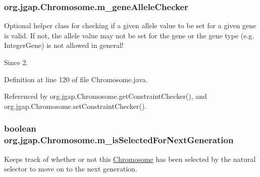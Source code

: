 \hypertarget{classorg_1_1jgap_1_1_chromosome_af890b1160c9b97defdf107e6a4e53329}{
\subsubsection[{m\-\_\-gene\-Allele\-Checker}]{ org.\-jgap.\-Chromosome.\-m\-\_\-gene\-Allele\-Checker\hspace{0.3cm}{\ttfamily [private]}}}\label{classorg_1_1jgap_1_1_chromosome_af890b1160c9b97defdf107e6a4e53329}
Optional helper class for checking if a given allele value to be set for a given gene is valid. If not, the allele value may not be set for the gene or the gene type (e.\-g. Integer\-Gene) is not allowed in general!

\begin{DoxySince}{Since}
2. 
\end{DoxySince}


Definition at line 120 of file Chromosome.\-java.



Referenced by org.\-jgap.\-Chromosome.\-get\-Constraint\-Checker(), and org.\-jgap.\-Chromosome.\-set\-Constraint\-Checker().

\hypertarget{classorg_1_1jgap_1_1_chromosome_ad8bb6734b245d112a8e6d66fb38914c9}{
\subsubsection[{m\-\_\-is\-Selected\-For\-Next\-Generation}]{\setlength{\rightskip}{0pt plus 5cm}boolean org.\-jgap.\-Chromosome.\-m\-\_\-is\-Selected\-For\-Next\-Generation\hspace{0.3cm}{\ttfamily [private]}}}\label{classorg_1_1jgap_1_1_chromosome_ad8bb6734b245d112a8e6d66fb38914c9}
Keeps track of whether or not this \hyperlink{classorg_1_1jgap_1_1_chromosome}{Chromosome} has been selected by the natural selector to move on to the next generation. 


